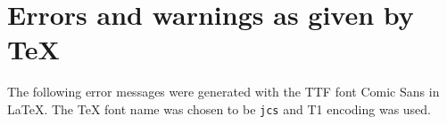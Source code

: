 \documentclass[10pt]{scrartcl}
\begin{document}
\section*{Errors and warnings as given by {\TeX}}

\begin{minipage}{\textwidth}
The following error messages were generated with the TTF font Comic Sans in {\LaTeX}. The {\TeX} font name was chosen to be \texttt{jcs} and T1 encoding was used.
\end{minipage}

\bigskip

\newlength{\errormsgboxwidth}
\setlength{\errormsgboxwidth}{15cm}
\end{document}
